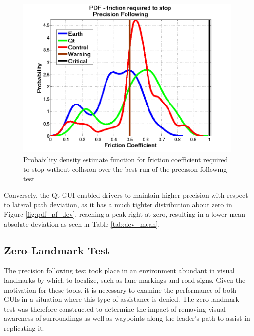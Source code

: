 \documentclass[twocolumn,10pt]{article}
\begin{document}
    \begin{figure}[ht] \centering
      \includegraphics[width=\columnwidth]{../graphics/precision_following_mu_distribution.png}
      \caption{Probability density estimate function for friction coefficient required to stop without collision over the best run of the precision following test}
      \label{fig:pdf_pf_mu}
    \end{figure}

    Conversely, the Qt GUI enabled drivers to maintain higher precision with respect to lateral path deviation, as it has a much tighter distribution about zero in Figure \ref{fig:pdf_pf_dev}, reaching a peak right at zero, resulting in a lower mean absolute deviation as seen in Table \ref{tab:dev_mean}.



  \subsection*{Zero-Landmark Test}

    The precision following test took place in an environment abundant in visual landmarks by which to localize, such as lane markings and road signs.  Given the motivation for these tools, it is necessary to examine the performance of both GUIs in a situation where this type of assistance is denied.  The zero landmark test was therefore constructed to determine the impact of removing visual awareness of surroundings as well as waypoints along the leader's path to assist in replicating it.
    
\end{document}
